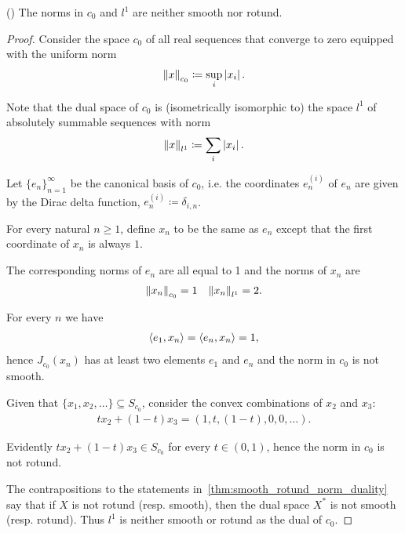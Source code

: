 \begin{example}\label{thm:c0_l1_not_smooth_rotund}(\cite[exercise 2.37(c)]{Phelps1993})
  The norms in $c_0$ and $l^1$ are neither smooth nor rotund.
\end{example}
\begin{proof}
  Consider the space $c_0$ of all real sequences that converge to zero equipped with the uniform norm
  \begin{align*}
    \left\Vert x \right\Vert_{c_0} \coloneqq \sup_i \left\vert x_i \right\vert.
  \end{align*}

  Note that the dual space of $c_0$ is (isometrically isomorphic to) the space $l^1$ of absolutely summable sequences with norm
  \begin{align*}
    \left\Vert x \right\Vert_{l^1} \coloneqq \sum_i \left\vert x_i \right\vert.
  \end{align*}

  Let $\{ e_n \}_{n=1}^\infty$ be the canonical basis of $c_0$, i.e. the coordinates $e^{(i)}_n$ of $e_n$ are given by the Dirac delta function, $e^{(i)}_n \coloneqq \delta_{i,n}$.

  For every natural $n \geq 1$, define $x_n$ to be the same as $e_n$ except that the first coordinate of $x_n$ is always $1$.

  The corresponding norms of $e_n$ are all equal to 1 and the norms of $x_n$ are
  \begin{align*}
    \left\Vert x_n \right\Vert_{c_0} = 1
    &&
    \left\Vert x_n \right\Vert_{l^1} = 2.
  \end{align*}

  For every $n$ we have
  \begin{align*}
    \left\langle e_1, x_n \right\rangle = \left\langle e_n, x_n \right\rangle = 1,
  \end{align*}
  hence $J_{c_0}(x_n)$ has at least two elements $e_1$ and $e_n$ and the norm in $c_0$ is not smooth.

  Given that $\{ x_1, x_2, \ldots \} \subseteq S_{c_0}$, consider the convex combinations of $x_2$ and $x_3$:
  \begin{align*}
    tx_2 + (1-t)x_3
    =
    (1, t, (1-t), 0, 0, \ldots).
  \end{align*}

  Evidently $tx_2 + (1-t)x_3 \in S_{c_0}$ for every $t \in (0, 1)$, hence the norm in $c_0$ is not rotund.

  The contrapositions to the statements in~\cref{thm:smooth_rotund_norm_duality} say that if $X$ is not rotund (resp. smooth), then the dual space $X^*$ is not smooth (resp. rotund). Thus $l^1$ is neither smooth or rotund as the dual of $c_0$.
\end{proof}

